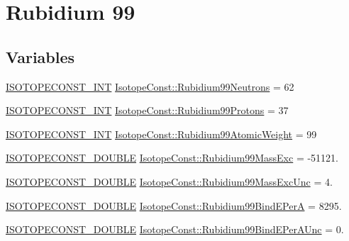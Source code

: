 \hypertarget{group___isotope_const-_rubidium-_rb99}{}\section{Rubidium 99}
\label{group___isotope_const-_rubidium-_rb99}
\subsection*{Variables}
\begin{DoxyCompactItemize}
\item 
\mbox{\hyperlink{group___isotope_const-_macros_ga5f18360b3e99483a35c32d789e62621c}{I\+S\+O\+T\+O\+P\+E\+C\+O\+N\+S\+T\+\_\+\+I\+NT}} \mbox{\hyperlink{group___isotope_const-_rubidium-_rb99_ga7b07e75bfa51cf1aff02878f114584e3}{Isotope\+Const\+::\+Rubidium99\+Neutrons}} = 62
\item 
\mbox{\hyperlink{group___isotope_const-_macros_ga5f18360b3e99483a35c32d789e62621c}{I\+S\+O\+T\+O\+P\+E\+C\+O\+N\+S\+T\+\_\+\+I\+NT}} \mbox{\hyperlink{group___isotope_const-_rubidium-_rb99_gab709ef25d937de12143e72a9bc0cb643}{Isotope\+Const\+::\+Rubidium99\+Protons}} = 37
\item 
\mbox{\hyperlink{group___isotope_const-_macros_ga5f18360b3e99483a35c32d789e62621c}{I\+S\+O\+T\+O\+P\+E\+C\+O\+N\+S\+T\+\_\+\+I\+NT}} \mbox{\hyperlink{group___isotope_const-_rubidium-_rb99_gab406c095603acbf75579f417e24d79d1}{Isotope\+Const\+::\+Rubidium99\+Atomic\+Weight}} = 99
\item 
\mbox{\hyperlink{group___isotope_const-_macros_ga8f45a7272ce02c0b4c65c44636ed719a}{I\+S\+O\+T\+O\+P\+E\+C\+O\+N\+S\+T\+\_\+\+D\+O\+U\+B\+LE}} \mbox{\hyperlink{group___isotope_const-_rubidium-_rb99_gacbe7a8d1c131d7044ea2e79806e3ca59}{Isotope\+Const\+::\+Rubidium99\+Mass\+Exc}} = -\/51121.
\item 
\mbox{\hyperlink{group___isotope_const-_macros_ga8f45a7272ce02c0b4c65c44636ed719a}{I\+S\+O\+T\+O\+P\+E\+C\+O\+N\+S\+T\+\_\+\+D\+O\+U\+B\+LE}} \mbox{\hyperlink{group___isotope_const-_rubidium-_rb99_gaf1fee1f32d31969d97abeda7460a4ee9}{Isotope\+Const\+::\+Rubidium99\+Mass\+Exc\+Unc}} = 4.
\item 
\mbox{\hyperlink{group___isotope_const-_macros_ga8f45a7272ce02c0b4c65c44636ed719a}{I\+S\+O\+T\+O\+P\+E\+C\+O\+N\+S\+T\+\_\+\+D\+O\+U\+B\+LE}} \mbox{\hyperlink{group___isotope_const-_rubidium-_rb99_ga6d169bf6039b3173d1674efea906f47c}{Isotope\+Const\+::\+Rubidium99\+Bind\+E\+PerA}} = 8295.
\item 
\mbox{\hyperlink{group___isotope_const-_macros_ga8f45a7272ce02c0b4c65c44636ed719a}{I\+S\+O\+T\+O\+P\+E\+C\+O\+N\+S\+T\+\_\+\+D\+O\+U\+B\+LE}} \mbox{\hyperlink{group___isotope_const-_rubidium-_rb99_ga83399b25b2fbe0c9cfeaabcc51d1aae9}{Isotope\+Const\+::\+Rubidium99\+Bind\+E\+Per\+A\+Unc}} = 0.

\end{DoxyCompactItemize}
